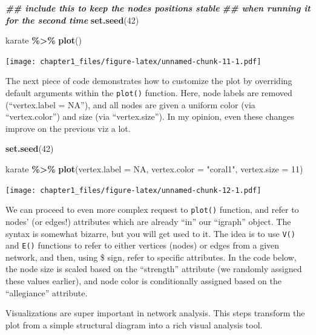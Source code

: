 \documentclass[
]{book}
\newenvironment{Shaded}{\begin{snugshade}}{\end{snugshade}}
\newcommand{\AttributeTok}[1]{\textcolor[rgb]{0.13,0.29,0.53}{#1}}
\newcommand{\ConstantTok}[1]{\textcolor[rgb]{0.56,0.35,0.01}{#1}}
\newcommand{\DecValTok}[1]{\textcolor[rgb]{0.00,0.00,0.81}{#1}}
\newcommand{\DocumentationTok}[1]{\textcolor[rgb]{0.56,0.35,0.01}{\textbf{\textit{#1}}}}
\newcommand{\FunctionTok}[1]{\textcolor[rgb]{0.13,0.29,0.53}{\textbf{#1}}}
\newcommand{\NormalTok}[1]{#1}
\newcommand{\SpecialCharTok}[1]{\textcolor[rgb]{0.81,0.36,0.00}{\textbf{#1}}}
\newcommand{\StringTok}[1]{\textcolor[rgb]{0.31,0.60,0.02}{#1}}
\begin{document}
\begin{Shaded}
\begin{Highlighting}[]
\DocumentationTok{\#\# include this to keep the nodes\textquotesingle{} positions stable}
\DocumentationTok{\#\# when running it for the second time}
\FunctionTok{set.seed}\NormalTok{(}\DecValTok{42}\NormalTok{) }

\NormalTok{karate }\SpecialCharTok{\%\textgreater{}\%} 
  \FunctionTok{plot}\NormalTok{()}
\end{Highlighting}
\end{Shaded}

\texttt{[image: chapter1\_files/figure-latex/unnamed-chunk-11-1.pdf]}

The next piece of code demonstrates how to customize the plot by overriding default arguments within the \texttt{plot()} function. Here, node labels are removed (``vertex.label = NA''), and all nodes are given a uniform color (via ``vertex.color'') and size (via ``vertex.size''). In my opinion, even these changes improve on the previous viz a lot.

\begin{Shaded}
\begin{Highlighting}[]
\FunctionTok{set.seed}\NormalTok{(}\DecValTok{42}\NormalTok{) }

\NormalTok{karate }\SpecialCharTok{\%\textgreater{}\%} 
  \FunctionTok{plot}\NormalTok{(}\AttributeTok{vertex.label =} \ConstantTok{NA}\NormalTok{,}
       \AttributeTok{vertex.color =} \StringTok{"coral1"}\NormalTok{,}
       \AttributeTok{vertex.size =} \DecValTok{11}\NormalTok{)}
\end{Highlighting}
\end{Shaded}

\texttt{[image: chapter1\_files/figure-latex/unnamed-chunk-12-1.pdf]}

We can proceed to even more complex request to \texttt{plot()} function, and refer to nodes' (or edges!) attributes which are already ``in'' our ``igraph'' object. The syntax is somewhat bizarre, but you will get used to it. The idea is to use \texttt{V()} and \texttt{E()} functions to refer to either vertices (nodes) or edges from a given network, and then, using \$ sign, refer to specific attributes. In the code below, the node size is scaled based on the ``strength'' attribute (we randomly assigned these values earlier), and node color is conditionally assigned based on the ``allegiance'' attribute.

Visualizations are super important in network analysis. This steps transform the plot from a simple structural diagram into a rich visual analysis tool.
\end{document}
